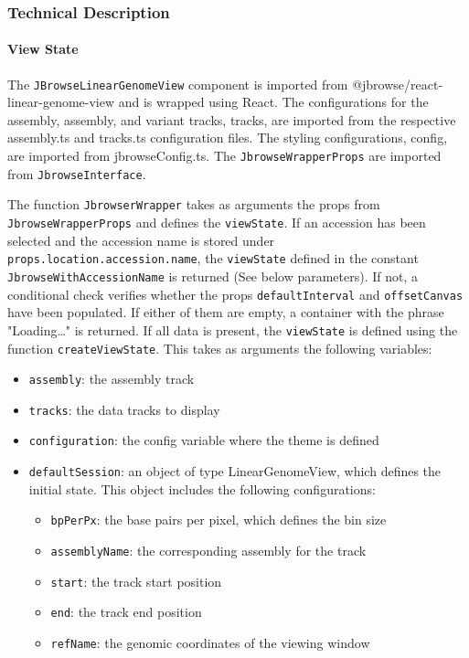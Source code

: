 \documentclass[12pt]{article}
\begin{document}
\begin{itemize}
\subsubsection{Technical Description}

\paragraph{View State} 
The \verb +JBrowseLinearGenomeView+ component is imported from @jbrowse/react-linear-genome-view and is wrapped using React. The configurations for the assembly, assembly, and variant tracks, tracks, are imported from the respective assembly.ts and tracks.ts configuration files. The styling configurations, config, are imported from jbrowseConfig.ts. The \verb +JbrowseWrapperProps+ are imported from \verb +JbrowseInterface+. 

The function \verb +JbrowserWrapper+ takes as arguments the props from \verb +JbrowseWrapperProps+ and defines the \verb +viewState+. If an accession has been selected and the accession name is stored under \verb +props.location.accession.name+, the \verb +viewState+ defined in the constant \verb +JbrowseWithAccessionName+ is returned (See below parameters). If not, a conditional check verifies whether the props \verb +defaultInterval+ and \verb +offsetCanvas+ have been populated. If either of them are empty, a container with the phrase "Loading…" is returned. If all data is present, the \verb +viewState+ is defined using the function \verb +createViewState+. This takes as arguments the following variables: 
\begin{itemize}
\item \verb +assembly+: the assembly track 
\item \verb +tracks+: the data tracks to display 
\item \verb +configuration+: the config variable where the theme is defined 
\item \verb +defaultSession+: an object of type LinearGenomeView, which defines the initial state. This object includes the following configurations: 
\begin{itemize}
\item \verb +bpPerPx+: the base pairs per pixel, which defines the bin size 
\item \verb +assemblyName+: the corresponding assembly for the track 
\item \verb +start+: the track start position 
\item \verb +end+: the track end position 
\item \verb +refName+: the genomic coordinates of the viewing window 
\end{itemize}
\end{itemize}


\end{itemize}
\end{document}

